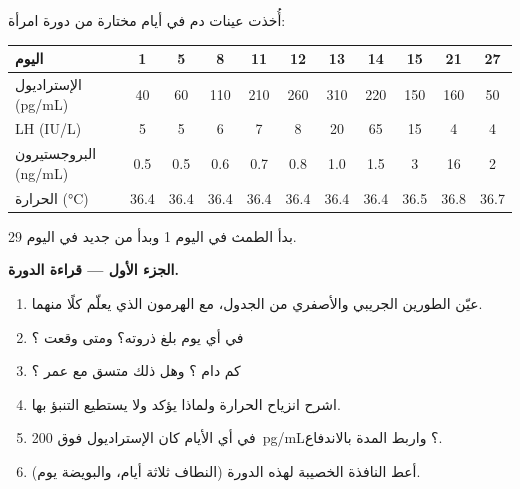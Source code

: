 \begin{problem}
\label{pb:b2:reproductive-hormones:1}
أُخذت عينات دم في أيام مختارة من دورة امرأة:

\begin{center}
\small
\begin{tabular}{lcccccccccc}
\hline
اليوم & 1 & 5 & 8 & 11 & 12 & 13 & 14 & 15 & 21 & 27 \\
\hline
الإستراديول (\unit{pg/mL}) & 40 & 60 & 110 & 210 & 260 & 310 & 220 & 150 & 160 & 50 \\
LH (\unit{IU/L}) & 5 & 5 & 6 & 7 & 8 & 20 & 65 & 15 & 4 & 4 \\
البروجستيرون (\unit{ng/mL}) & 0.5 & 0.5 & 0.6 & 0.7 & 0.8 & 1.0 & 1.5 & 3 & 16 & 2 \\
الحرارة (\unit{\celsius}) & 36.4 & 36.4 & 36.4 & 36.4 & 36.4 & 36.4 & 36.4 & 36.5 & 36.8 & 36.7 \\
\hline
\end{tabular}
\end{center}

بدأ الطمث في اليوم 1 وبدأ من جديد في اليوم 29.

\medskip
\noindent\textbf{الجزء الأول --- قراءة الدورة.}
\begin{enumerate}
  \item عيّن الطورين الجريبي والأصفري من الجدول،
        مع الهرمون الذي يعلّم كلًا منهما.
  \item في أي يوم بلغ  ذروته؟ ومتى وقعت ؟
  \item كم دام ؟ وهل ذلك متسق مع عمر
        ؟
  \item اشرح انزياح الحرارة ولماذا يؤكد  ولا
        يستطيع التنبؤ بها.
  \item في أي الأيام كان الإستراديول فوق \qty{200}{pg/mL}؟ واربط
        المدة بالاندفاع.
  \item أعط النافذة الخصيبة لهذه الدورة (النطاف ثلاثة أيام،
        والبويضة يوم).
\end{enumerate}


\end{problem}
